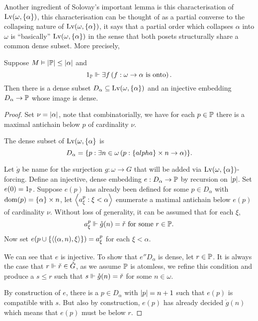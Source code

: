 Another ingredient of Solovay's important lemma is this characterisation of \(\Lv(\omega,\set{\alpha})\),
this characterisation can be thought of as a partial converse to the collapsing nature of \(\Lv(\omega,\set{\alpha})\),
it says that a partial order which collapses \(\alpha\) into \(\omega\) is ``basically'' \(\Lv(\omega,\set{\alpha})\)
in the sense that both posets structurally share a common dense subset.
More precisely,
\begin{lemma}\label{lemma:characterisation_collapse}
    Suppose \(M\models \abs{\P} \leq \abs{\alpha}\) and
    \[ 1_\P \forces \exists f\paren{f:\omega\to\alpha \text{ is onto}}.\]
    Then there is a dense subset \(D_\alpha\subseteq \Lv(\omega,\set{\alpha})\)
    and an injective embedding \(D_\alpha \to \P\) whose image is dense.
\end{lemma}
\begin{proof}
    Set \(\nu = \abs{\alpha}\),
    note that combinatorially, we have for each \(p\in\P\) there is a maximal antichain below \(p\) of cardinality \(\nu\).

    The dense subset of \(\Lv(\omega,\set{\alpha}\) is
    \[ D_\alpha = \set{p: \exists n\in\omega \paren{p: \set{alpha}\times n\to \alpha}}.\]

    Let \(\mathring{g}\) be name for the surjection \(g:\omega\to G\) that will be added via \(\Lv(\omega,\set{\alpha})\)-forcing.
    Define an injective, dense embedding \(e: D_\alpha\to\P\) by recursion on \(\abs{p}\).
    Set \(e(0) = 1_\P\).
    Suppose \(e(p)\) has already been defined for some \(p\in D_\alpha\) with \(\dom(p) = \set{\alpha}\times n\),
    let \(\Angle{a_\xi^p: \xi<\alpha}\) enumerate a matimal antichain below \(e(p)\) of cardinality \(\nu\).
    Without loss of generality, it can be assumed that for each \(\xi\),
    \[ a_\xi^p \forces \mathring{g}(n) = \check{r} \text{ for some } r\in \P. \]
    Now set \(e(p\cup \set{\Angle{(\alpha, n), \xi}}) = a_\xi^p\) for each \(\xi<\alpha\).

    We can see that \(e\) is injective.
    To show that \(e''D_\alpha\) is dense, let \(r\in \P\).
    It is always the case that \(r\forces \check{r}\in\mathring{G}\),
    as we assume \(\P\) is atomless, we refine this condition and produce a \(s\leq r\)
    such that \(s\forces \mathring{g}(n) = \check{r}\) for some \(n\in\omega\).

    By construction of \(e\), there is a \(p\in D_\alpha\) with \(\abs{p} = n+1\) such that \(e(p)\) is compatible with \(s\).
    But also by construction, \(e(p)\) has already decided \(\mathring{g}(n)\) which means that \(e(p)\) must be below \(r\).
\end{proof}

